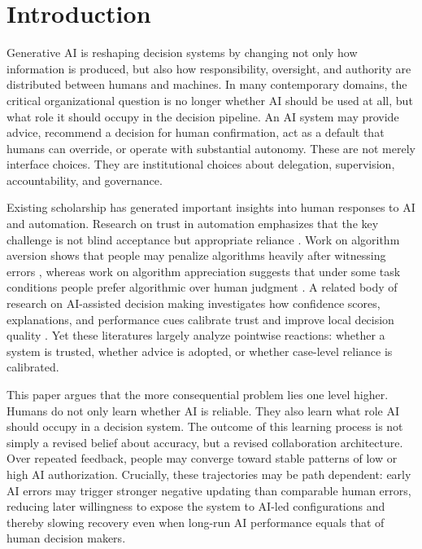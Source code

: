 \section{Introduction}

Generative AI is reshaping decision systems by changing not only how information is produced, but also how responsibility, oversight, and authority are distributed between humans and machines. In many contemporary domains, the critical organizational question is no longer whether AI should be used at all, but what role it should occupy in the decision pipeline. An AI system may provide advice, recommend a decision for human confirmation, act as a default that humans can override, or operate with substantial autonomy. These are not merely interface choices. They are institutional choices about delegation, supervision, accountability, and governance.

Existing scholarship has generated important insights into human responses to AI and automation. Research on trust in automation emphasizes that the key challenge is not blind acceptance but appropriate reliance \citep{lee2004trust}. Work on algorithm aversion shows that people may penalize algorithms heavily after witnessing errors \citep{dietvorst2015algorithm}, whereas work on algorithm appreciation suggests that under some task conditions people prefer algorithmic over human judgment \citep{logg2019algorithm}. A related body of research on AI-assisted decision making investigates how confidence scores, explanations, and performance cues calibrate trust and improve local decision quality \citep{zhang2020confidence,ma2023trust}. Yet these literatures largely analyze pointwise reactions: whether a system is trusted, whether advice is adopted, or whether case-level reliance is calibrated.

This paper argues that the more consequential problem lies one level higher. Humans do not only learn whether AI is reliable. They also learn what role AI should occupy in a decision system. The outcome of this learning process is not simply a revised belief about accuracy, but a revised collaboration architecture. Over repeated feedback, people may converge toward stable patterns of low or high AI authorization. Crucially, these trajectories may be path dependent: early AI errors may trigger stronger negative updating than comparable human errors, reducing later willingness to expose the system to AI-led configurations and thereby slowing recovery even when long-run AI performance equals that of human decision makers.

